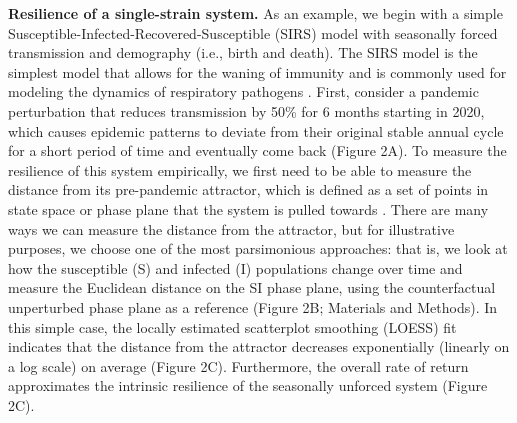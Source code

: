 \documentclass[12pt]{article}
\begin{document}
\textbf{Resilience of a single-strain system.} As an example, we begin with a simple Susceptible-Infected-Recovered-Susceptible (SIRS) model with seasonally forced transmission and demography (i.e., birth and death).
The SIRS model is the simplest model that allows for the waning of immunity and is commonly used for modeling the dynamics of respiratory pathogens \citep{dushoff2004dynamical}.
First, consider a pandemic perturbation that reduces transmission by 50\% for 6 months starting in 2020, which causes epidemic patterns to deviate from their original stable annual cycle for a short period of time and eventually come back (Figure 2A).
To measure the resilience of this system empirically, we first need to be able to measure the distance from its pre-pandemic attractor, which is defined as a set of points in state space or phase plane that the system is pulled towards \citep{hastings1993chaos}.
There are many ways we can measure the distance from the attractor, but for illustrative purposes, we choose one of the most parsimonious approaches: that is, we look at how the susceptible (S) and infected (I) populations change over time and measure the Euclidean distance on the SI phase plane, using the counterfactual unperturbed phase plane as a reference (Figure 2B; Materials and Methods).
In this simple case, the locally estimated scatterplot smoothing (LOESS) fit indicates that the distance from the attractor decreases exponentially (linearly on a log scale) on average (Figure 2C).
Furthermore, the overall rate of return approximates the intrinsic resilience of the seasonally unforced system (Figure 2C).
\end{document}
